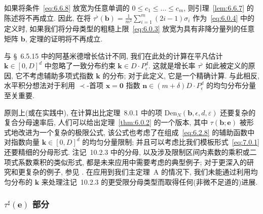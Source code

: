 \begin{remark}\label{rem:6.6.14}
如果将条件~\eqref{eq:6.6.8} 放宽为任意单调的 $0 \le c_1 \le \dots \le c_m$, 则引理~\ref{lem:6.6.7} 的陈述将不再成立.
因此, 在将 $\tau^{\flat}(\mathbf{b}) = \frac{1}{m^2} \sum_{i=1}^m (2i-1)\sigma_i$ 作为~\eqref{eq:6.0.4} 中的定义时, 如果我们将分母类型的粗糙上限~\eqref{eq:6.0.3} 放宽为具有非降分量列的任意矩阵 $\mathbf{b}$, 定理的证明将不再成立. \end{remark}

\begin{remark}\label{rem:6.6.15}
与 \S~6.5.15 中的阿基米德增长估计不同, 我们在此处的计算在平凡估计 $\mathbf{k} \in [0, D]^d$ 中忽略了一致分布约束 $\mathbf{k} \in D \cdot P_{\epsilon}^d$.
这就是增长率 $\tau^{\flat}$ 如此被定义的原因, 它不考虑辅助多项式指数 $\mathbf{k}$ 的分布; 对于此定义, 它是一个精确计算.
与此相反, 水平积分想法对于利用 $\prec$-首项 $\mathbf{x} = \mathbf{0}$ 指数 $\mathbf{n} \in (m + \delta)D \cdot P_{\epsilon}^d$ 的均匀分布分量至关重要.

原则上(或在实践中), 在计算出比定理~8.0.1 中的项 $\mathrm{Den}_N(\mathbf{b},\epsilon,d,\varepsilon)$ 还要复杂的复合分母速率后, 人们可以给出定理~\ref{thm:6.0.2} 的一个版本, 其中 $\tau(\mathbf{b};\mathbf{e})$ 被形式地改进为一个复杂的极限公式, 该公式也考虑了在组成~\eqref{eq:6.2.8} 的辅助函数中对指数向量 $\mathbf{k} \in [0,D]^d$ 的均匀分量限制; 并且可以考虑比我们模板形式~\eqref{eq:7.0.1} 还要精细的分母形式.
注记~10.2.3 中的分母, 以及涉及限制区间内素数的乘积或二项式系数乘积的类似形式, 都是未来应用中需要考虑的典型例子; 对于更深入的研究和更复杂的例子, 参见 \cite{Vio04}\cite{RV96}\cite{Sor16}\cite{Zud14}\cite{DZ14}.
在应用到我们主定理~A 的情况下, 我们未能通过利用均匀分布的 $\mathbf{k}$ 来处理注记~10.2.3 的更受限分母类型而取得任何(非微不足道的)进展. \end{remark}

\subsubsection{$\tau^{\sharp}(\mathbf{e})$ 部分}\label{sec:6.6.16}

